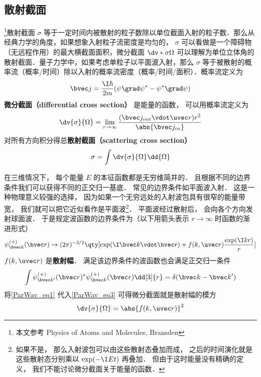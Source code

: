 

\subsection{散射截面}

\footnote{本文参考 Physics of Atoms and Molecules, Bransden}散射截面 $\sigma$ 等于一定时间内被散射的粒子数除以单位截面入射的粒子数．那么从经典力学的角度，如果想象入射粒子流密度是均匀的， $\sigma$ 可以看做是一个障碍物（无远程作用）的最大横截面面积，微分截面 $\dv*{\sigma}{\Omega}$ 可以理解为单位立体角的散射截面．量子力学中，如果考虑单粒子以平面波入射，那么 $\sigma$ 等于被散射的概率流（概率/时间）除以入射的概率流密度（概率/时间/面积）．概率流定义为
\begin{equation}
\bvec j = \frac{\I\hbar }{2m}(\psi \grad \psi^* - \psi^* \grad \psi )
\end{equation}
\textbf{微分截面（differential cross section）} 是能量的函数， 可以用概率流定义为
\begin{equation}\label{ParWav_eq3}
\dv{\sigma}{\Omega} = \lim_{r\to\infty} \frac{(\bvec j_{out} \vdot \uvec r) r^2}{\abs{\bvec j_{in}}}
\end{equation}
对所有方向积分得总\textbf{散射截面（scattering cross section）}
\begin{equation}
\sigma = \int \dv{\sigma}{\Omega} \dd{\Omega} 
\end{equation}

在三维情况下， 每个能量 $E$ 的本征函数都是无穷维简并的． 且根据不同的边界条件我们可以获得不同的正交归一基底． 常见的边界条件如平面波入射． 这是一种物理意义较强的选择， 因为如果一个无穷远处的入射波包具有很窄的能量带宽， 我们就可以把它近似看作是平面波\footnote{如果不是， 那么入射波包可以由这些散射态叠加而成， 之后的时间演化就是这些散射态分别乘以 $\exp(-\I E t)$ 再叠加． 但由于这时能量没有精确的定义， 我们不能讨论微分截面关于能量的函数．}． 平面波经过散射后， 会向各个方向发射球面波． 于是规定波函数的边界条件为（以下用箭头表示 $r\to\infty$ 时函数的渐进形式）
\begin{equation}\label{ParWav_eq1}
\psi_{\bvec k}^{(+)}(\bvec r) \rightarrow (2\pi)^{-3/2} \qty[\exp(\I \bvec k \vdot \bvec r) + f(k, \uvec r) \frac{\exp(\I k r)}{r}]
\end{equation}
$f(k, \uvec r)$ 是\textbf{散射幅}． 满足该边界条件的波函数也会满足正交归一条件
\begin{equation}
\int \psi_{\bvec k'}^{(+)}(\bvec r)^* \psi_{\bvec k}^{(+)}(\bvec r) \dd[3]{r} = \delta(\bvec k - \bvec k')
\end{equation}
将\autoref{ParWav_eq1} 代入\autoref{ParWav_eq3} 可得微分截面就是散射幅的模方
\begin{equation}
\dv{\sigma}{\Omega} = \abs{f(k, \uvec r)}^2
\end{equation}

